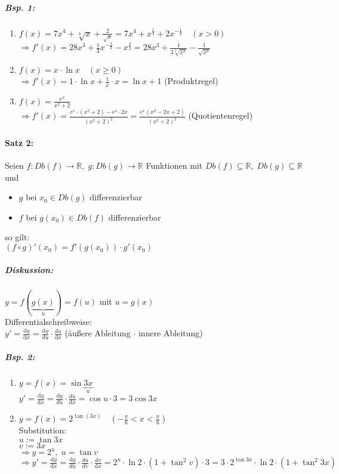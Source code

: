 \subparagraph{Bsp. 1:}
\begin{enumerate}[label=\alph*.)]
\item $f(x)=7x^4+\sqrt[3]{x}+\frac{2}{\sqrt{x}} = 7x^4+x^{\frac{1}{3}}+2x^{-\frac{1}{2}} \quad (x>0)$\\
$\Rightarrow f'(x) = 28 x^3 + \frac{1}{3}x^{-\frac{2}{3}}-x^{\frac{3}{2}}=28x^3+\frac{1}{3\sqrt[3]{x^2}}-\frac{1}{\sqrt{x^3}}$
\item $f(x)=x\cdot \ln x \quad (x\geq 0)$\\
$\Rightarrow f'(x) = 1 \cdot \ln x + \frac{1}{x} \cdot x = \ln x + 1$ (Produktregel)
\item $f(x)=\frac{e^x}{x^2+2}$\\
$\Rightarrow f'(x)=\frac{e^x\cdot (x^2+2)-e^x\cdot 2x}{(x^2+2)^2}=\frac{e^x(x^2-2x+2)}{(x^2+2)^2}$ (Quotientenregel)

\end{enumerate}

\paragraph{Satz 2:} Seien $f: Db(f)\to \mathbb{R}, \; g: Db(g) \to \mathbb{R}$ Funktionen mit $Db(f) \subseteq \mathbb{R}, \; Db(g) \subseteq \mathbb{R}$ und 
\begin{itemize}
\item $g$ bei $x_0 \in Db(g)$ differenzierbar
\item $f$ bei $g(x_0) \in Db (f)$ differenzierbar
\end{itemize}
so gilt:\\
$(f\circ g)'(x_0)=f'(g(x_0))\cdot g'(x_0)$
\subparagraph{Diskussion:} $y=f( \underbrace{g(x)}_{u})=f(u)$ mit $u=g(x)$\\
Differentialschreibweise:\\
$y'=\frac{\mathrm{d}y}{\mathrm{d}x}=\frac{\mathrm{d}y}{du}\cdot \frac{du}{\mathrm{d}x}$ \quad (äußere Ableitung $\cdot$ innere Ableitung)

\subparagraph{Bsp. 2:}
\begin{enumerate}[label=\alph*.)]
\item $y=f(x)=\sin \underbrace{3x}_u$\\
$y'=\frac{\mathrm{d}y}{\mathrm{d}x}=\frac{\mathrm{d}y}{du}\cdot \frac{du}{\mathrm{d}x}=\cos u \cdot 3=3 \cos 3x$
\item $y=f(x)=2^{\tan(3x)} \quad \left(-\frac{\pi}{6}<x<\frac{\pi}{6}\right)$\\
Substitution: \\
$u:=\tan 3x$\\
$v:=3x$\\
$\Rightarrow y = 2^u, \; u = \tan v$\\
$\Rightarrow y' = \frac{\mathrm{d}y}{\mathrm{d}x}=\frac{\mathrm{d}y}{du} \cdot \frac{du}{dv} \cdot \frac{dv}{\mathrm{d}x} = 2^u\cdot \ln 2 \cdot (1+\tan^2 v) \cdot 3= 3\cdot 2^{\tan 3x} \cdot \ln 2 \cdot (1+\tan^2 3x)$
\end{enumerate}

